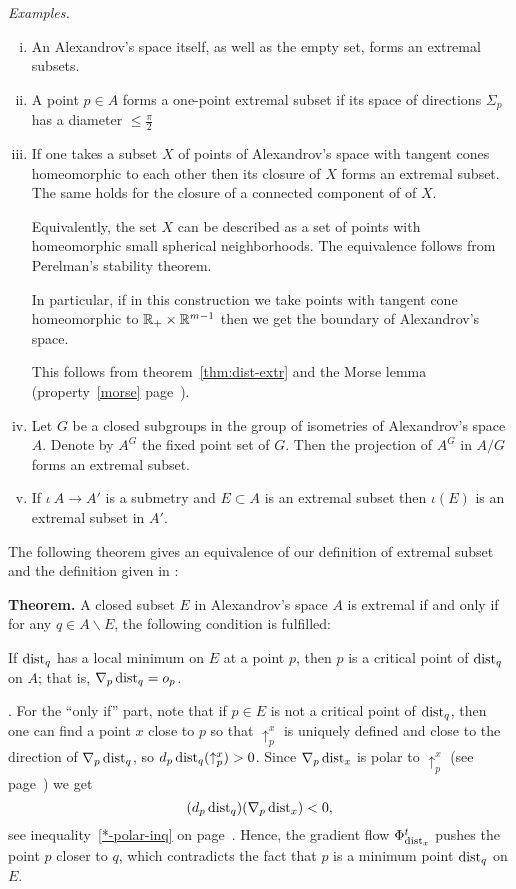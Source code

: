 \documentclass{article}
\begin{document}
\noi\textit{Examples.}
\begin{enumerate}[(i)]
\item An Alexandrov's space itself, as well as the empty set, forms an extremal subsets.
\item A point $p\in A$ forms a one-point extremal subset if its
space of directions $\Sigma_p$ has a diameter $\le\tfrac\pi2$
\item \label{ex:t-cone}
If one takes a subset $X$ of points of Alexandrov's space with tangent cones
homeomorphic to each other then its closure of $X$ forms an extremal subset.
The same holds for the closure of a connected component of of $X$.

Equivalently, the set $X$ can be described as a set of points with homeomorphic small spherical neighborhoods. The equivalence follows from Perelman's stability theorem.

In particular, if in this construction we take points with tangent cone homeomorphic
to $\mathbb{R}_{+}\times \mathbb{R}^{m-1}$ then we get the boundary of Alexandrov's space.

This follows from theorem~\ref{thm:dist-extr} and the Morse lemma (property~\ref{morse} page~\pageref{morse}). 

\item  Let $G$ be a closed subgroups in the group of isometries of Alexandrov's space $A$.
Denote by $A^G$ the fixed point set of $G$.
Then the projection of $A^G$ in $A/G$ forms an extremal subset.

\item If $\iota\:A\to A'$ is a submetry and $E\subset A$ is an extremal subset then $\iota(E)$ is an extremal subset in $A'$.
\end{enumerate}


\noi The following theorem gives an equivalence of our definition of extremal subset and the definition given in
\cite{perelman-petrunin:extremal}:

\begin{thm}{\bf Theorem.}\label{thm:dist-extr}  A closed subset $E$ in Alexandrov's space $A$ is extremal if and only if for any $q\in A\backslash E$,
the following condition is fulfilled:

If $\operatorname{dist}_q$ has a local minimum on $E$ at a point $p$, then $p$ is a critical
point of $\operatorname{dist}_q$ on $A$;
that is, $\nabla_p\operatorname{dist}_q=o_p$.
\end{thm}

\Proof. For the ``only if'' part, note that if $p\in E$ is not a critical point of
$\operatorname{dist}_q$, then one can find a point $x$ close to $p$ so that $\uparrow_p^x$ is
uniquely defined and close to the direction of $\nabla_p\operatorname{dist}_q$,
so $d_p\operatorname{dist}_q(\uparrow_p^x)>0$. 
Since $\nabla_p\operatorname{dist}_x$ is polar to $\uparrow_p^x$ (see
page~\pageref{supp-polar}) we get 
$$(d_p\operatorname{dist}_q)(\nabla_p\operatorname{dist}_x)<0,$$ 
see inequality~\ref{*-polar-inq} on page~\pageref{*-polar-inq}.
Hence, the gradient flow $\Phi_{\operatorname{dist}_x}^t$ pushes the point $p$ closer to $q$, which
contradicts the fact that $p$ is a minimum point $\operatorname{dist}_q$ on $E$.
\end{document}
